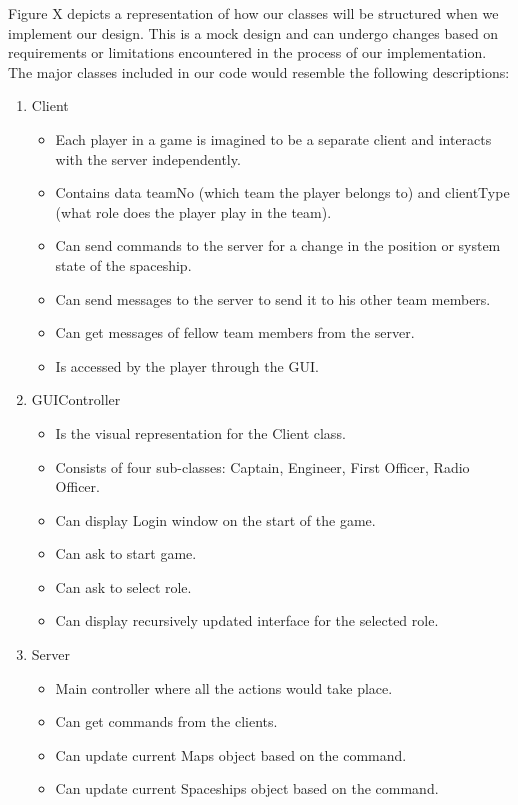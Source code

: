 
Figure X depicts a representation of how our classes will be structured when we implement our design. This is a mock design and can undergo changes based on requirements or limitations encountered in the process of our implementation. The major classes included in our code would resemble the following descriptions: 

\begin{enumerate}
\item Client
\begin{itemize}
\item Each player in a game is imagined to be a separate client and interacts with the server independently.
\item Contains data teamNo (which team the player belongs to) and clientType (what role does the player play in the team).
\item Can send commands to the server for a change in the position or system state of the spaceship.
\item Can send messages to the server to send it to his other team members.
\item Can get messages of fellow team members from the server.
\item Is accessed by the player through the GUI.
\end{itemize}
\item GUIController
\begin{itemize}
\item Is the visual representation for the Client class.
\item Consists of four sub-classes: Captain, Engineer, First Officer, Radio Officer.
\item Can display Login window on the start of the game.
\item Can ask to start game.
\item Can ask to select role.
\item Can display recursively updated interface for the selected role.
\end{itemize}
\item Server
\begin{itemize}
\item Main controller where all the actions would take place.
\item Can get commands from the clients.
\item Can update current Maps object based on the command.
\item Can update current Spaceships object based on the command.

\end{itemize}
\end{enumerate}
